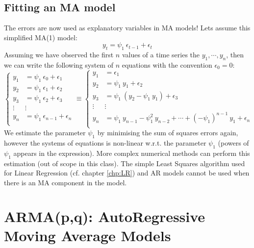 \documentclass[a4paper,11pt,oneside,onecolumn]{book}
\begin{document}
\section{Fitting an MA model}
The errors are now used as explanatory variables in MA models!
Lets assume this simplified  MA(1) model:
$$
 y_t  =  \psi_1\ \epsilon_{t-1} + \epsilon_t
$$
Assuming we have observed the first $n$ values of a time series the $y_1, \cdots,y_n$, then
we can write the following system of $n$ equations with the convention $\epsilon_0=0$:
$$
\left\lbrace
\begin{array}{ll}
 y_1 & =   \psi_1\ \epsilon_{0} + \epsilon_1\\
 y_2 & =   \psi_1\ \epsilon_{1} + \epsilon_2\\
 y_3 & =   \psi_1\ \epsilon_{2} + \epsilon_3\\
\vdots &\vdots\\
y_n & =   \psi_1\ \epsilon_{n-1} + \epsilon_n\\
\end{array}\right.
\equiv
\left\lbrace
\begin{array}{ll}
 y_1 & =    \epsilon_1\\
 y_2 & =   \psi_1\ y_1 + \epsilon_2\\
 y_3 & =   \psi_1\ (y_2 - \psi_1\ y_1) + \epsilon_3\\
\vdots &\vdots\\
y_n & =   \psi_1\  y_{n-1}-\psi_1^2\  y_{n-2}+\cdots+(-\psi_1)^{n-1}\ y_1 + \epsilon_n\\
\end{array}\right.
$$
 We estimate the parameter $\psi_1$ by minimising the sum of squares errors again, however the  systems of equations is  non-linear w.r.t. the parameter  $\psi_1$ 
(powers of $\psi_1$ appears in the expression). More complex numerical methods can perform this estimation (out of scope in this class). 
The simple Least Squares algorithm  used for Linear Regression (cf. chapter \ref{chp:LR}) and AR models cannot be used when there is an MA component in the model. 



\chapter{ARMA(p,q): AutoRegressive Moving Average Models}
\label{chp:ARMA}
\end{document}
